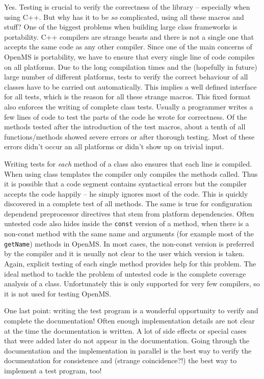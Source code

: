 \documentclass[a4]{article}
\begin{document}
Yes. Testing is crucial to verify the correctness of the library -- especially when
using C++. But why has it to be {\em so} complicated, using all these macros
and stuff? One of the biggest problems when building large class frameworks is
portability. C++ compilers are strange beasts and there is not a single one
that accepts the same code as any other compiler. Since one of the main
concerns of OpenMS is portability, we have to ensure that every single line of
code compiles on all platforms. Due to the long compilation times and the
(hopefully in future) large number of different platforms, tests to verify the
correct behaviour of all classes have to be carried out automatically. This
implies a well defined interface for all tests, which is the reason for all
these strange macros. This fixed format also enforces the writing of complete
class tests. Usually a programmer writes a few lines of code to test the parts
of the code he wrote for correctness. Of the methods tested after the
introduction of the test macros, about a tenth of all functions/methods showed
severe errors or after thorough testing. Most of these errors didn't occur an
all platforms or didn't show up on trivial input.

Writing tests for {\em each} method of a class also ensures that each line is
compiled. When using class templates the compiler only compiles the methods
called. Thus it is possible that a code segment contains syntactical errors
but the compiler accepts the code happily -- he simply ignores most of the
code. This is quickly discovered in a complete test of all methods. The same
is true for configuration dependend preprocessor directives that stem from
platform dependencies. Often untested code also hides inside the {\tt const}
version of a method, when there is a non-const method with the same name and
arguments (for example most of the {\tt getName}) methods in OpenMS. In most
cases, the non-const version is preferred by the compiler and it is usually
not clear to the user which version is taken. Again, explicit testing of each
single method provides help for this problem.
The ideal method to tackle the problem of untested code is the complete
coverage analysis of a class. Unfortunately this is only supported for very
few compilers, so it is not used for testing OpenMS.

One last point: writing the
test program is a wonderful opportunity to verify and complete the
documentation! Often enough implementation details are not clear at the time
the documentation is written. A lot of side effects or special cases that were
added later do not appear in the documentation. Going through the
documentation and the implementation in parallel is the best way to verify the
documentation for consistence and (strange coincidence?!) the best way to
implement a test program, too!
\end{document}

